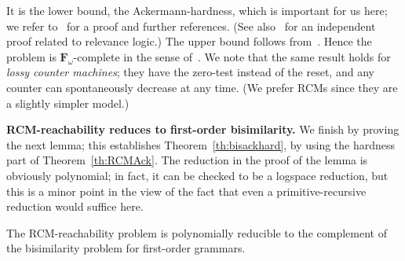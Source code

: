 \documentclass[a4paper,11pt]{article}
\begin{document}
It is the lower bound, the  Ackermann-hardness, which is important
for us here; we refer to~\cite{DBLP:conf/mfcs/Schnoebelen10} for a proof 
and further references.
(See also~\cite{DBLP:journals/jsyml/Urquhart99}
for an independent proof related to relevance logic.)
The upper bound follows from~\cite{DBLP:conf/lics/FigueiraFSS11}.
Hence the problem is
$\mathbf{F}_\omega$-complete in the sense of~\cite{Schmitz2013}.
We note that the same result holds for
\emph{lossy counter machines}; they have the zero-test instead of the
reset, and any counter can spontaneously decrease at any time.
(We prefer RCMs since they are a slightly simpler model.)

\textbf{RCM-reachability reduces to first-order bisimilarity.}
We finish by proving  the next lemma; this establishes 
Theorem~\ref{th:bisackhard}, by 
using the hardness part of Theorem~\ref{th:RCMAck}.
The reduction in the proof of the lemma is obviously polynomial; in
fact, it can be checked to be a logspace reduction, 
but this is a minor point in the view of the fact that even a 
primitive-recursive reduction would suffice here.

\begin{lemma}
The RCM-reachability problem is polynomially reducible to the complement 
of the bisimilarity problem for
first-order grammars.
\end{lemma}
\end{document}
